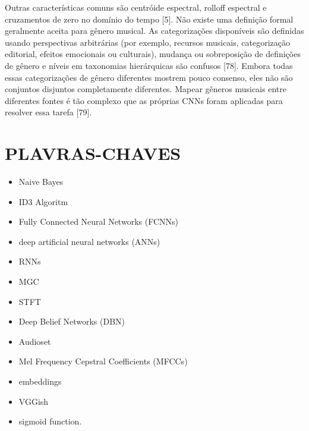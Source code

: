 \documentclass{article}
\begin{document}
Outras características comuns são centróide espectral, rolloff espectral e cruzamentos de zero no domínio do tempo [5].
Não existe uma definição formal geralmente aceita para gênero musical. 
As categorizações disponíveis são definidas usando perspectivas arbitrárias (por exemplo, recursos musicais, categorização editorial, efeitos emocionais ou culturais), mudança ou sobreposição de definições de gênero e níveis em taxonomias hierárquicas são confusos [78]. 
Embora todas essas categorizações de gênero diferentes mostrem pouco consenso, eles não são conjuntos disjuntos completamente diferentes. 
Mapear gêneros musicais entre diferentes fontes é tão complexo que as próprias CNNs foram aplicadas para resolver essa tarefa [79].
\section{PLAVRAS-CHAVES}
\begin{itemize}
    	\item Naive Bayes
    	\item ID3 Algoritm
    	\item Fully Connected Neural Networks (FCNNs)
    	\item deep artificial neural networks (ANNs)
	\item RNNs
	\item MGC
	\item STFT
	\item Deep Belief Networks (DBN)
	\item Audioset
	\item Mel Frequency Cepstral Coefficients (MFCCs)
	\item embeddings
	\item VGGish
	\item sigmoid function.
\end{itemize}
\end{document}
